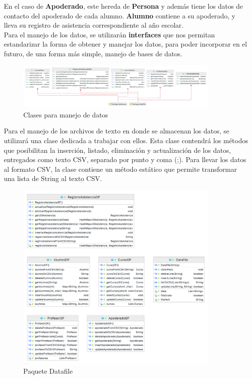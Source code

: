 En el caso de \textbf{Apoderado}, este hereda de \textbf{Persona} y además tiene los datos de contacto del apoderado de cada alumno. \textbf{Alumno} contiene a su apoderado, y lleva su registro de asistencia correspondiente al año escolar.\\
	
Para el manejo de los datos, se utilizarán \textbf{interfaces} que nos permitan estandarizar la forma de obtener y manejar los datos, para poder incorporar en el futuro, de una forma más simple, manejo de bases de datos.\\

\begin{figure}[h]
    \centering
    \includegraphics[width=0.9\textwidth]{contents/img/img2}
    \caption{Clases para manejo de datos}
    \label{fig:img2}
\end{figure}

Para el manejo de los archivos de texto en donde se almacenan los datos, se utilizará una clase dedicada a trabajar con ellos. Esta clase contendrá los métodos que posibilitan la inserción, listado, eliminación y actualización de los datos, entregados como texto CSV, separado por punto y coma (;). Para llevar los datos al formato CSV, la clase contiene un método estático que permite transformar una lista de String al texto CSV.

\begin{figure}[h]
    \centering
    \includegraphics[width=0.9\textwidth]{contents/img/img3}
    \caption{Paquete Datafile}
    \label{fig:img3}
\end{figure}

